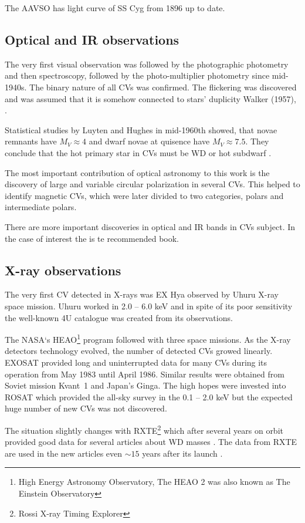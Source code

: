 \documentclass[oneside,a4paper,11pt]{report}
\begin{document}
The AAVSO has light curve of SS Cyg from 1896 up to date. 

\subsection{Optical and IR observations}
The very first visual observation was followed by the photographic photometry and then spectroscopy, 
followed by the photo-multiplier photometry since mid-1940s. The binary nature of all CVs was confirmed. 
The flickering was discovered and was assumed that it is somehow connected to stars' duplicity Walker (1957),
\citet{warner:1}.

Statistical studies by Luyten and Hughes in mid-1960th showed, that novae remnants have $M_V \approx 4$ and 
dwarf novae at quisence have $M_V \approx 7.5$. They conclude that the hot primary star in CVs must be WD or 
 hot subdwarf \citet{warner:1}.   

The most important contribution of optical astronomy to this work is the discovery of large and 
variable circular polarization in several CVs. This helped to identify magnetic CVs, 
which were later divided to two categories, polars and intermediate polars.

There are more important discoveries in optical and IR bands in CVs subject. In the case of interest the 
 \citet{warner:1} is te recommended book. 
   
   
\subsection{X-ray observations}
The very first CV detected in X-rays was EX Hya observed by Uhuru X-ray space mission. 
Uhuru worked in 2.0 – 6.0 keV and in spite of its poor sensitivity the well-known 4U catalogue
 was created \citet{1978ApJS...38..357F} from its observations.

The NASA`s HEAO\footnote{High Energy Astronomy Observatory, The HEAO 2 was also known as 
The Einstein Observatory} program followed with three space missions. As the X-ray detectors 
technology evolved, the number of detected CVs growed linearly. \mbox{EXOSAT} provided long and 
uninterrupted data for many CVs during its operation from May 1983 until April 1986. 
Similar results were obtained from Soviet mission \mbox{Kvant 1} and Japan's Ginga.
The high hopes were invested into ROSAT which provided the all-sky survey in the
 0.1 – 2.0 keV but the expected huge number of new CVs was not discovered. 

The situation slightly changes with RXTE\footnote{Rossi X-ray Timing Explorer} which after several 
years on orbit provided good data for several articles about WD masses \citet{2005A&A...435..191S}. 
The data from RXTE are used in the new articles even $\sim15$ years after its launch \citet{2011A&A...526A..77B}.
 
\end{document}
